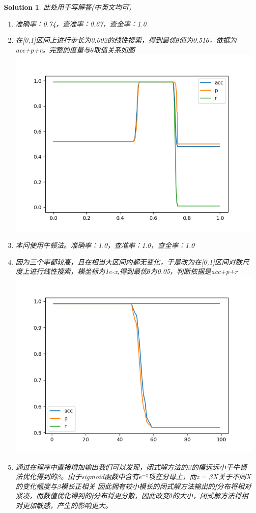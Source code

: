 \documentclass[a4paper,UTF8]{article}
\numberwithin{equation}{section}
\newtheorem*{solution}{Solution}
\begin{document}
\begin{solution} 此处用于写解答(中英文均可)
	\begin{enumerate}[(1)]
		\item 准确率：0.74，查准率：0.67，查全率：1.0
		\item 在[0,1]区间上进行步长为0.002的线性搜索，得到最优$\theta$值为0.516，依据为acc+p+r。完整的度量与$\theta$取值关系如图
			  \\ \includegraphics[scale=0.8]{figure/0_graph.png}
		\item 本问使用牛顿法。准确率：1.0，查准率：1.0，查全率：1.0
		\item 因为三个率都较高，且在相当大区间内都无变化，于是改为在[0,1]区间对数尺度上进行线性搜索，横坐标为1e-x,得到最优$\theta$为0.05，判断依据是acc+p+r\\
			  \includegraphics[scale=0.8]{figure/1_graph.png}
		\item 通过在程序中直接增加输出我们可以发现，闭式解方法的$\beta$的模远远小于牛顿法优化得到的$\beta$。由于sigmoid函数中含有$e^{-z}$项在分母上，而$z=\beta X$关于不同X的变化幅度与$\beta$模长正相关
			  因此拥有较小模长的闭式解方法输出的f分布将相对紧凑，而数值优化得到的f分布将更分散，因此改变$\theta$的大小，闭式解方法将相对更加敏感，产生的影响更大。
	\end{enumerate}
\end{solution}
\end{document}
